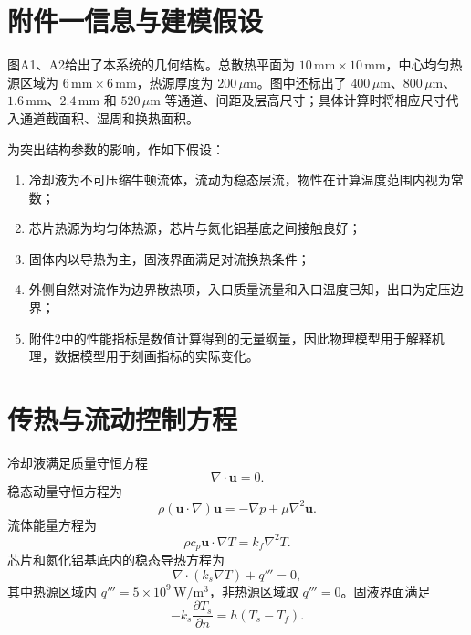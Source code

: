 \documentclass[UTF8,a4paper,12pt]{ctexart}
\begin{document}
\section{附件一信息与建模假设}

图A1、A2给出了本系统的几何结构。总散热平面为 $10\,\mathrm{mm}\times10\,\mathrm{mm}$，中心均匀热源区域为 $6\,\mathrm{mm}\times6\,\mathrm{mm}$，热源厚度为 $200\,\mu\mathrm m$。图中还标出了 $400\,\mu\mathrm m$、$800\,\mu\mathrm m$、$1.6\,\mathrm{mm}$、$2.4\,\mathrm{mm}$ 和 $520\,\mu\mathrm m$ 等通道、间距及层高尺寸；具体计算时将相应尺寸代入通道截面积、湿周和换热面积。

为突出结构参数的影响，作如下假设：
\begin{enumerate}
  \item 冷却液为不可压缩牛顿流体，流动为稳态层流，物性在计算温度范围内视为常数；
  \item 芯片热源为均匀体热源，芯片与氮化铝基底之间接触良好；
  \item 固体内以导热为主，固液界面满足对流换热条件；
  \item 外侧自然对流作为边界散热项，入口质量流量和入口温度已知，出口为定压边界；
  \item 附件2中的性能指标是数值计算得到的无量纲量，因此物理模型用于解释机理，数据模型用于刻画指标的实际变化。
\end{enumerate}

\section{传热与流动控制方程}

冷却液满足质量守恒方程
\begin{equation}
\nabla\cdot\bm u=0.
\end{equation}
稳态动量守恒方程为
\begin{equation}
\rho(\bm u\cdot\nabla)\bm u=-\nabla p+\mu\nabla^2\bm u.
\end{equation}
流体能量方程为
\begin{equation}
\rho c_p\bm u\cdot\nabla T=k_f\nabla^2T.
\end{equation}
芯片和氮化铝基底内的稳态导热方程为
\begin{equation}
\nabla\cdot(k_s\nabla T)+q'''=0,
\end{equation}
其中热源区域内 $q'''=5\times10^9\,\mathrm{W/m^3}$，非热源区域取 $q'''=0$。固液界面满足
\begin{equation}
 -k_s\frac{\partial T_s}{\partial n}=h(T_s-T_f).
\end{equation}
\end{document}
